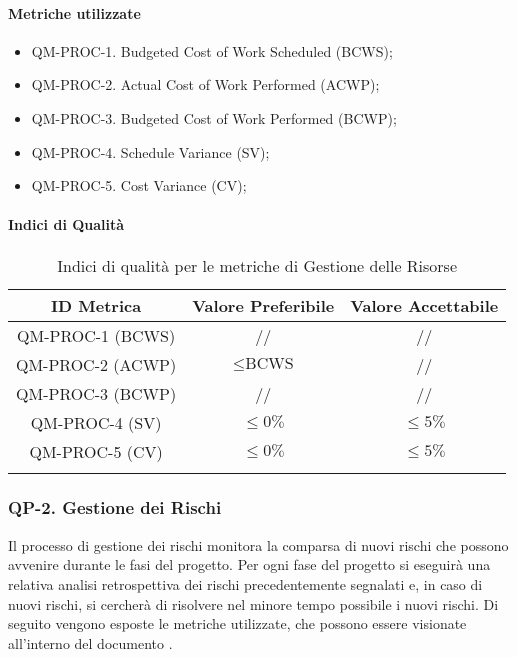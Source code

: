 		\paragraph{Metriche utilizzate}

			\begin{itemize}
				\item QM-PROC-1. Budgeted Cost of Work Scheduled (BCWS);
				\item QM-PROC-2. Actual Cost of Work Performed (ACWP);
				\item QM-PROC-3. Budgeted Cost of Work Performed (BCWP);
				\item QM-PROC-4. Schedule Variance (SV);
				\item QM-PROC-5. Cost Variance (CV);
			\end{itemize}

		\paragraph{Indici di Qualità}

			\begin{center}
				\begin{longtable}{|c|c|c|}
				\hline
				\rowcolor{lighter-grayer}
				\textbf{ID Metrica} & \textbf{Valore Preferibile} & \textbf{Valore Accettabile}\\
				\hline
				\endfirsthead
				\hline
				QM-PROC-1 (BCWS) & // & // \\
				\hline
				QM-PROC-2 (ACWP) & \( \le \text{BCWS}\) & // \\
				\hline
				QM-PROC-3 (BCWP) & // & // \\
				\hline
				QM-PROC-4 (SV) & \(\le 0\%\) & \(\le 5\%\) \\
				\hline
				QM-PROC-5 (CV) & \(\le 0\%\) & \(\le 5\%\) \\
				\hline
				\caption{Indici di qualità per le metriche di Gestione delle Risorse}
				\end{longtable}
			\end{center}

	\subsubsection{QP-2. Gestione dei Rischi}

		Il processo di gestione dei rischi monitora la comparsa di nuovi rischi che possono avvenire durante le fasi del progetto.
		Per ogni fase del progetto si eseguirà una relativa analisi retrospettiva dei rischi precedentemente segnalati e, in caso di nuovi rischi, si cercherà di risolvere nel minore tempo possibile i nuovi rischi.
		Di seguito vengono esposte le metriche utilizzate, che possono essere visionate all'interno del documento .

